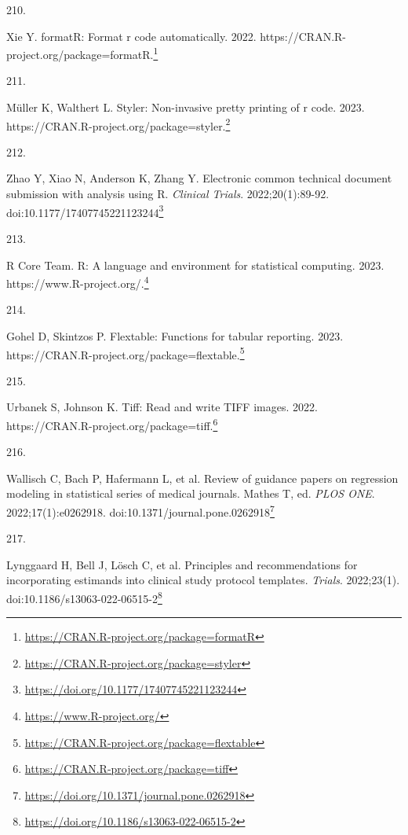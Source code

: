 \documentclass[
  a4paper,
]{book}
\newlength{\cslhangindent}
\newlength{\csllabelwidth}
\newlength{\cslentryspacingunit} %
\newenvironment{CSLReferences}[2] %
 {%
  \setlength{\parindent}{0pt}
  \ifodd #1
  \let\oldpar\par
  \def\par{\hangindent=\cslhangindent\oldpar}
  \fi
  \setlength{\parskip}{#2\cslentryspacingunit}
 }%
 {}
\newcommand{\CSLLeftMargin}[1]{\parbox[t]{\csllabelwidth}{#1}}
\newcommand{\CSLRightInline}[1]{\parbox[t]{\linewidth - \csllabelwidth}{#1}\break}
\renewcommand{\href}[2]{#2\footnote{\url{#1}}}
\begin{document}
\begin{CSLReferences}{0}{0}
\leavevmode{}%
\CSLLeftMargin{210. }%
\CSLRightInline{Xie Y. formatR: Format r code automatically. 2022. \href{https://CRAN.R-project.org/package=formatR}{https://CRAN.R-project.org/package=formatR.}}

\leavevmode{}%
\CSLLeftMargin{211. }%
\CSLRightInline{Müller K, Walthert L. Styler: Non-invasive pretty printing of r code. 2023. \href{https://CRAN.R-project.org/package=styler}{https://CRAN.R-project.org/package=styler.}}

\leavevmode{}%
\CSLLeftMargin{212. }%
\CSLRightInline{Zhao Y, Xiao N, Anderson K, Zhang Y. Electronic common technical document submission with analysis using R. \emph{Clinical Trials}. 2022;20(1):89-92. doi:\href{https://doi.org/10.1177/17407745221123244}{10.1177/17407745221123244}}

\leavevmode{}%
\CSLLeftMargin{213. }%
\CSLRightInline{R Core Team. R: A language and environment for statistical computing. 2023. \href{https://www.R-project.org/}{https://www.R-project.org/.}}

\leavevmode{}%
\CSLLeftMargin{214. }%
\CSLRightInline{Gohel D, Skintzos P. Flextable: Functions for tabular reporting. 2023. \href{https://CRAN.R-project.org/package=flextable}{https://CRAN.R-project.org/package=flextable.}}

\leavevmode{}%
\CSLLeftMargin{215. }%
\CSLRightInline{Urbanek S, Johnson K. Tiff: Read and write TIFF images. 2022. \href{https://CRAN.R-project.org/package=tiff}{https://CRAN.R-project.org/package=tiff.}}

\leavevmode{}%
\CSLLeftMargin{216. }%
\CSLRightInline{Wallisch C, Bach P, Hafermann L, et al. Review of guidance papers on regression modeling in statistical series of medical journals. Mathes T, ed. \emph{PLOS ONE}. 2022;17(1):e0262918. doi:\href{https://doi.org/10.1371/journal.pone.0262918}{10.1371/journal.pone.0262918}}

\leavevmode{}%
\CSLLeftMargin{217. }%
\CSLRightInline{Lynggaard H, Bell J, Lösch C, et al. Principles and recommendations for incorporating estimands into clinical study protocol templates. \emph{Trials}. 2022;23(1). doi:\href{https://doi.org/10.1186/s13063-022-06515-2}{10.1186/s13063-022-06515-2}}


\end{CSLReferences}
\end{document}
